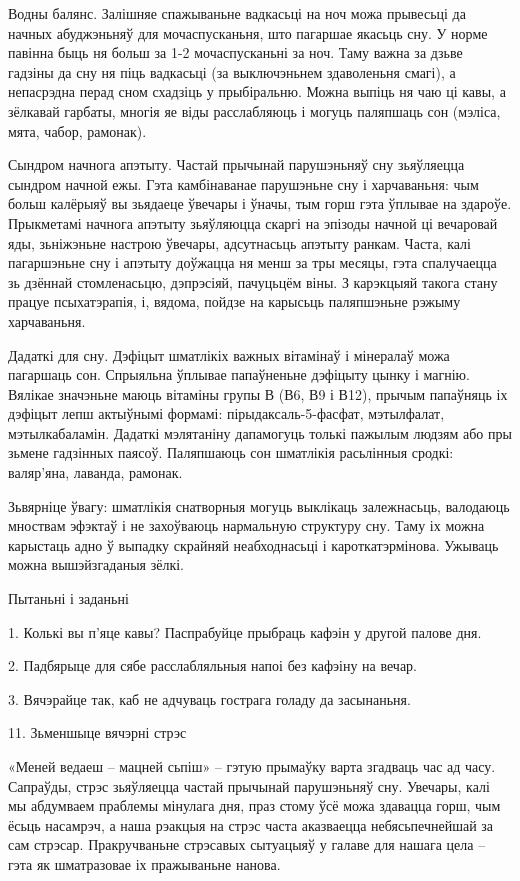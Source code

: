 Водны балянс. Залішняе спажываньне вадкасьці на ноч можа прывесьці да начных абуджэньняў для мочаспусканьня, што пагаршае якасьць сну. У норме павінна быць ня больш за 1-2 мочаспусканьні за ноч. Таму важна за дзьве гадзіны да сну ня піць вадкасьці (за выключэньнем здаволеньня смагі), а непасрэдна перад сном схадзіць у прыбіральню. Можна выпіць ня чаю ці кавы, а зёлкавай гарбаты, многія яе віды расслабляюць і могуць паляпшаць сон (мэліса, мята, чабор, рамонак).

Сындром начнога апэтыту. Частай прычынай парушэньняў сну зьяўляецца сындром начной ежы. Гэта камбінаванае парушэньне сну і харчаваньня: чым больш калёрыяў вы зьядаеце ўвечары і ўначы, тым горш гэта ўплывае на здароўе. Прыкметамі начнога апэтыту зьяўляюцца скаргі на эпізоды начной ці вечаровай яды, зьніжэньне настрою ўвечары, адсутнасьць апэтыту ранкам. Часта, калі пагаршэньне сну і апэтыту доўжацца ня менш за тры месяцы, гэта спалучаецца зь дзённай стомленасьцю, дэпрэсіяй, пачуцьцём віны. З карэкцыяй такога стану працуе псыхатэрапія, і, вядома, пойдзе на карысьць паляпшэньне рэжыму харчаваньня.

Дадаткі для сну. Дэфіцыт шматлікіх важных вітамінаў і мінералаў можа пагаршаць сон. Спрыяльна ўплывае папаўненьне дэфіцыту цынку і магнію. Вялікае значэньне маюць вітаміны групы В (В6, В9 і В12), прычым папаўняць іх дэфіцыт лепш актыўнымі формамі: пірыдаксаль-5-фасфат, мэтылфалат, мэтылкабаламін. Дадаткі мэлятаніну дапамогуць толькі пажылым людзям або пры зьмене гадзінных паясоў. Паляпшаюць сон шматлікія расьлінныя сродкі: валяр'яна, лаванда, рамонак.

Зьвярніце ўвагу: шматлікія снатворныя могуць выклікаць залежнасьць, валодаюць мноствам эфэктаў і не захоўваюць нармальную структуру сну. Таму іх можна карыстаць адно ў выпадку скрайняй неабходнасьці і кароткатэрмінова. Ужываць можна вышэйзгаданыя зёлкі.

Пытаньні і заданьні

1. Колькі вы п'яце кавы? Паспрабуйце прыбраць кафэін у другой палове дня.

2. Падбярыце для сябе расслабляльныя напоі без кафэіну на вечар.

3. Вячэрайце так, каб не адчуваць гострага голаду да засынаньня.


11. Зьменшыце вячэрні стрэс

«Меней ведаеш – мацней сьпіш» – гэтую прымаўку варта згадваць час ад часу. Сапраўды, стрэс зьяўляецца частай прычынай парушэньняў сну. Увечары, калі мы абдумваем праблемы мінулага дня, праз стому ўсё можа здавацца горш, чым ёсьць насамрэч, а наша рэакцыя на стрэс часта аказваецца небясьпечнейшай за сам стрэсар. Пракручваньне стрэсавых сытуацыяў у галаве для нашага цела – гэта як шматразовае іх пражываньне нанова.


